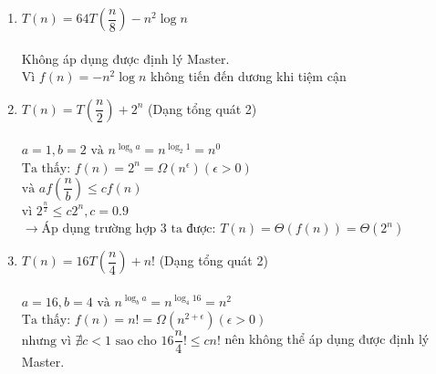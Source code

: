 \documentclass[12pt, letterpaper]{article}
\begin{document}
\begin{enumerate}[label=\bfseries\large\theenumi.]
    \item $ T(n) = 64T\left( \dfrac{n}{8} \right) - n^2 \log n $ \\ \\
        Không áp dụng được định lý Master. \\
        Vì $ f(n) = -n^2 \log n $ không tiến đến dương khi tiệm cận \\

    \item $ T(n) = T\left( \dfrac{n}{2} \right) + 2^n $ (Dạng tổng quát 2) \\ \\
        $ a = 1, b = 2 \text{ và } n^{\log_b a} = n^{\log_2 1} = n^0 $ \\
        $ \text{Ta thấy: } f(n) = 2^n = \Omega(n^\epsilon) (\epsilon > 0) $ \\
        $ \text{và } af\left(\dfrac{n}{b}\right) \leq cf(n) $ \\
        $ \text{vì } 2^{\frac{n}{2}} \leq c 2^n, c = 0.9 $ \\
        $ \rightarrow \text{Áp dụng trường hợp 3 ta được: } T(n) = \Theta(f(n)) = \Theta(2^n) $

    \item $ T(n) = 16T\left( \dfrac{n}{4} \right) + n! $ (Dạng tổng quát 2)\\ \\
        $ a = 16, b = 4 \text{ và } n^{\log_b a} = n^{\log_4 16} = n^2 $ \\
        $ \text{Ta thấy: } f(n) = n! = \Omega(n^{2 + \epsilon}) (\epsilon > 0) $ \\
        $ \text{nhưng vì } \nexists c < 1 \text{ sao cho } 16 \dfrac{n}{4}! \leq c n! $
        nên không thể áp dụng được định lý Master. \\
\end{enumerate}
\end{document}
